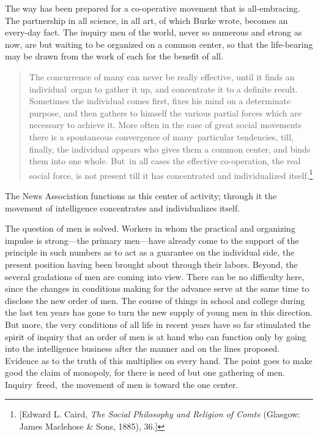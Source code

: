 \documentclass[openany,nobib]{tufte-book}
\begin{document}
The way has been prepared for a co-operative movement that is
all-embracing. The partnership in all science, in all art, of which
Burke wrote, becomes an every-day fact. The inquiry men of the world,
never so numerous and strong as now, are but waiting to be organized on
a common center, so that the life-bearing may be drawn from the work of
each for the benefit of all.

\begin{quote}
The concurrence of many can never be really effective, until it finds an
individual~organ to gather it up, and concentrate it to a definite
result. Sometimes the individual comes first, fixes his mind on a
determinate purpose, and then gathers to himself the various partial
forces which are necessary to achieve it. More often in the case of
great social movements there is a spontaneous convergence of
many~particular tendencies, till, finally, the individual appears who
gives them a common center, and binds them into one whole. But~in all
cases the effective co-operation, the real social force, is not present
till it has concentrated and individualized itself.\footnote{{[}Edward
  L. Caird, \emph{The Social Philosophy and Religion of Comte} (Glasgow:
  James Maclehose \& Sons, 1885),
  36.\href{applewebdata://D02306DF-3E46-4684-BD1A-1A323FFB2CB2\#_msocom_1}{{]}}}
\end{quote}

\noindent The News Association functions as this center of activity; through it
the movement of intelligence concentrates and individualizes itself.~

The question of men is solved. Workers in whom the practical and
organizing impulse is strong---the primary men---have already come to
the support of the principle in such numbers as to act as a guarantee on
the individual side, the present position having been brought about
through their labors. Beyond, the several gradations of men are coming
into view. There can be no difficulty here, since the changes in
conditions making for the advance serve at the same time to disclose the
new order of men. The course of things in school and college during the
last ten years has gone to turn the new supply of young men in this
direction. But more, the very conditions of all life in recent years
have so far stimulated the spirit of inquiry that an order of men is at
hand who can function only by going into the intelligence business after
the manner and on the lines proposed. Evidence as to the truth of this
multiplies on every hand. The point goes to make good the claim of
monopoly, for there is need of but one gathering of men.
Inquiry~freed,~the movement of men is toward the one center.~
\end{document}
